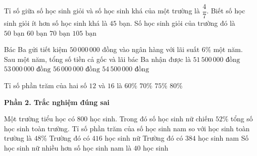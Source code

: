 \begin{ex} %
Tỉ số giữa số học sinh giỏi và số học sinh khá của một trường là $\dfrac{4}{7}$. Biết số học sinh giỏi ít hơn số học sinh khá là $45$ bạn. Số học sinh giỏi của trường đó là
\choice
{$50\text{ bạn}$}
{\True $60\text{ bạn}$}
{$70\text{ bạn}$}
{$105\text{ bạn}$}
\end{ex}

\begin{ex} %
Bác Ba gửi tiết kiệm $50\,000\,000$ đồng vào ngân hàng với lãi suất $6\%$ một năm. Sau một năm, tổng số tiền cả gốc và lãi bác Ba nhận được là
\choice
{$51\,500\,000\text{ đồng}$}
{\True $53\,000\,000\text{ đồng}$}
{$56\,000\,000\text{ đồng}$}
{$54\,500\,000\text{ đồng}$}
\end{ex}

\begin{ex} %
Tỉ số phần trăm của hai số $12$ và $16$ là
\choice
{$60\%$}
{$70\%$}
{\True $75\%$}
{$80\%$}
\end{ex}

\textbf{Phần 2. Trắc nghiệm đúng sai}

\begin{ex} %
Một trường tiểu học có $800$ học sinh. Trong đó số học sinh nữ chiếm $52\%$ tổng số học sinh toàn trường.
\choiceTF
{\True Tỉ số phần trăm của số học sinh nam so với học sinh toàn trường là $48\%$}
{\True Trường đó có $416$ học sinh nữ}
{\True Trường đó có $384$ học sinh nam}
{Số học sinh nữ nhiều hơn số học sinh nam là $40$ học sinh}
\end{ex}

